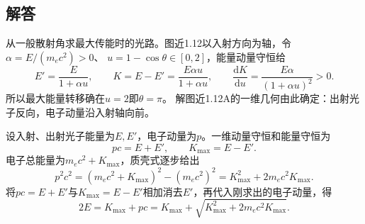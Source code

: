 \documentclass[UTF8,fontset=fandol,a4paper,11pt]{ctexart}
\begin{document}
\subsection*{解答}


从一般散射角求最大传能时的光路。图近1.12以入射方向为轴，令$\alpha=E/(m_ec^2)>0$、
$u=1-\cos\theta\in[0,2]$，能量动量守恒给
\[
E'=\frac E{1+\alpha u},\qquad
K=E-E'=\frac{E\alpha u}{1+\alpha u},\qquad
\frac{\mathrm dK}{\mathrm du}=\frac{E\alpha}{(1+\alpha u)^2}>0.
\]
所以最大能量转移确在$u=2$即$\theta=\pi$。
解图近1.12A的一维几何由此确定：出射光子反向，电子动量沿入射轴向前。

设入射、出射光子能量为$E,E'$，电子动量为$p$。一维动量守恒和能量守恒为
\[
pc=E+E',\qquad K_{\max}=E-E'.
\]
电子总能量为$m_ec^2+K_{\max}$，质壳式逐步给出
\[
p^2c^2=(m_ec^2+K_{\max})^2-(m_ec^2)^2
=K_{\max}^2+2m_ec^2K_{\max}.
\]
将$pc=E+E'$与$K_{\max}=E-E'$相加消去$E'$，再代入刚求出的电子动量，得
\[
2E=K_{\max}+pc
=K_{\max}+\sqrt{K_{\max}^2+2m_ec^2K_{\max}}.
\]
\end{document}
